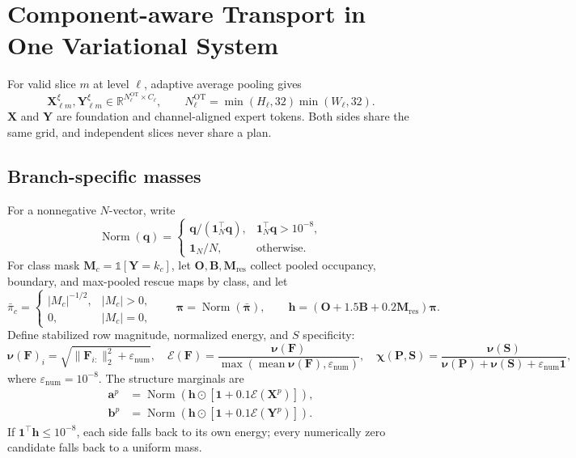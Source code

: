 \documentclass[10pt]{article}
\newcommand{\R}{\mathbb{R}}
\newcommand{\ones}{\bm{1}}
\newcommand{\Norm}{\operatorname{Norm}}
\newcommand{\ind}{\mathbb{1}}
\begin{document}
\section{Component-aware Transport in One Variational System}

For valid slice $m$ at level $\ell$, adaptive average pooling gives
\begin{equation}
 \bm X_{\ell m}^\xi,\bm Y_{\ell m}^\xi
 \in\R^{N_\ell^{\mathrm{OT}}\times C_\ell},
 \qquad
 N_\ell^{\mathrm{OT}}
 =\min(H_\ell,32)\min(W_\ell,32).
 \label{eq:ot-tokens}
\end{equation}
$\bm X$ and $\bm Y$ are foundation and channel-aligned expert tokens.  Both
sides share the same grid, and independent slices never share a plan.

\subsection{Branch-specific masses}

For a nonnegative $N$-vector, write
\[
 \Norm(\bm q)=
 \begin{cases}
  \bm q/(\ones_N^\top\bm q),&\ones_N^\top\bm q>10^{-8},\\
  \ones_N/N,&\text{otherwise}.
 \end{cases}
\]
For class mask $\bm M_c=\ind[\bm Y=k_c]$, let
$\bm O,\bm B,\bm M_{\mathrm{res}}$ collect pooled occupancy, boundary, and
max-pooled rescue maps by class, and let
\[
 \bar\pi_c=
 \begin{cases}|M_c|^{-1/2},&|M_c|>0,\\0,&|M_c|=0,\end{cases}
 \qquad
 \bm\pi=\Norm(\bar{\bm\pi}),\qquad
 \bm h=(\bm O+1.5\bm B+0.2\bm M_{\mathrm{res}})\bm\pi .
\]
Define stabilized row magnitude, normalized energy, and $S$ specificity:
\[
 \bm\nu(\bm F)_i=\sqrt{\|\bm F_{i:}\|_2^2+\varepsilon_{\mathrm{num}}},
 \quad
 \mathcal E(\bm F)=
 \frac{\bm\nu(\bm F)}
 {\max(\operatorname{mean}\bm\nu(\bm F),\varepsilon_{\mathrm{num}})},
 \quad
 \bm\chi(\bm P,\bm S)=
 \frac{\bm\nu(\bm S)}
 {\bm\nu(\bm P)+\bm\nu(\bm S)+\varepsilon_{\mathrm{num}}\ones},
\]
where $\varepsilon_{\mathrm{num}}=10^{-8}$.  The structure marginals are
\begin{equation}
\boxed{
\begin{aligned}
 \bm a^p&=\Norm\!\left(
  \bm h\odot[\ones+0.1\mathcal E(\bm X^p)]\right),\\
 \bm b^p&=\Norm\!\left(
  \bm h\odot[\ones+0.1\mathcal E(\bm Y^p)]\right).
\end{aligned}}
\label{eq:p-mass-matrix}
\end{equation}
If $\ones^\top\bm h\leq10^{-8}$, each side falls back to its own energy; every
numerically zero candidate falls back to a uniform mass.
\end{document}
